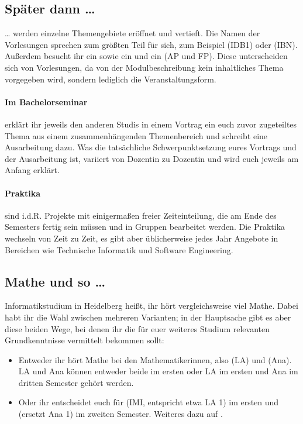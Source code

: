 \subsection{Später dann \dots{}}

\dots{} werden einzelne Themengebiete eröffnet und vertieft. Die Namen der Vorlesungen sprechen zum größten Teil für sich, zum Beispiel  (\gls{IDB1}) oder  (\gls{IBN}). Außerdem besucht ihr ein  sowie ein  und ein  (\gls{AP} und \gls{FP}). Diese unterscheiden sich von Vorlesungen, da von der Modulbeschreibung kein inhaltliches Thema vorgegeben wird, sondern lediglich die Veranstaltungsform.

\paragraph*{Im Bachelorseminar} erklärt ihr jeweils den anderen Studis in einem Vortrag ein euch zuvor zugeteiltes Thema aus einem zusammenhängenden Themenbereich und schreibt eine Ausarbeitung dazu. Was die tatsächliche Schwerpunktsetzung eures Vortrags und der Ausarbeitung ist, variiert von Dozentin zu Dozentin und wird euch jeweils am Anfang erklärt.

\paragraph*{Praktika} sind i.d.R. Projekte mit einigermaßen freier Zeiteinteilung, die am Ende des Semesters fertig sein müssen und in Gruppen bearbeitet werden. Die Praktika wechseln von Zeit zu Zeit, es gibt aber üblicherweise jedes Jahr Angebote in Bereichen wie Technische Informatik und Software Engineering.

\subsection{Mathe und so \dots}

Informatikstudium in Heidelberg heißt, ihr hört vergleichsweise viel Mathe. Dabei habt ihr die Wahl zwischen mehreren Varianten; in der Hauptsache gibt es aber diese beiden Wege, bei denen ihr die für euer weiteres Studium relevanten Grundkenntnisse vermittelt bekommen sollt:

\begin{itemize}
    \item Entweder ihr hört Mathe bei den Mathematikerinnen, also  (\gls{LA}) und  (\gls{Ana}). \gls{LA} und \gls{Ana} können entweder beide im ersten oder \gls{LA} im ersten und \gls{Ana} im dritten Semester gehört werden.
    \item Oder ihr entscheidet euch für  (\gls{IMI}, entspricht etwa \gls{LA} 1) im ersten und  (ersetzt \gls{Ana} 1) im zweiten Semester. Weiteres dazu auf . 
\end{itemize}

